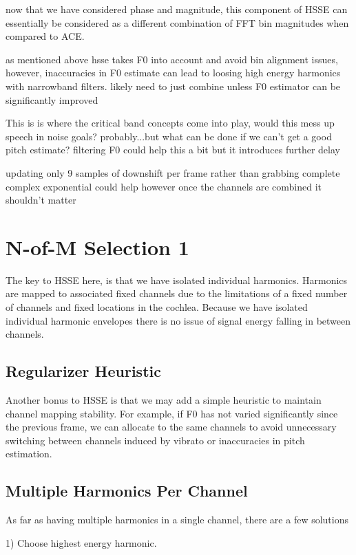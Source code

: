 \documentclass [11pt, proquest] {uwthesis}[2015/03/03]
\begin{document}
now that we have considered phase and magnitude, this component of HSSE can essentially be considered as a different combination of FFT bin magnitudes when compared to ACE.

as mentioned above hsse takes F0 into account and avoid bin alignment issues, however, inaccuracies in F0 estimate can lead to loosing high energy harmonics with narrowband filters.  likely need to just combine unless F0 estimator can be significantly improved

This is is where the critical band concepts come into play, would this mess up speech in noise goals? probably...but what can be done if we can't get a good pitch estimate?  filtering F0 could help this a bit but it introduces further delay

updating only 9 samples of downshift per frame rather than grabbing complete complex exponential could help however once the channels are combined it shouldn't matter

\section{N-of-M Selection 1}

The key to HSSE here, is that we have isolated individual harmonics.  Harmonics are mapped to associated fixed channels due to the limitations of a fixed number of channels and fixed locations in the cochlea.  Because we have isolated individual harmonic envelopes there is no issue of signal energy falling in between channels.

\subsection{Regularizer Heuristic}

Another bonus to HSSE is that we may add a simple heuristic to maintain channel mapping stability.  For example, if F0 has not varied significantly since the previous frame, we can allocate to the same channels to avoid unnecessary switching between channels induced by vibrato or inaccuracies in pitch estimation.

\subsection{Multiple Harmonics Per Channel}
As far as having multiple harmonics in a single channel, there are a few solutions

1) Choose highest energy harmonic.
\end{document}
